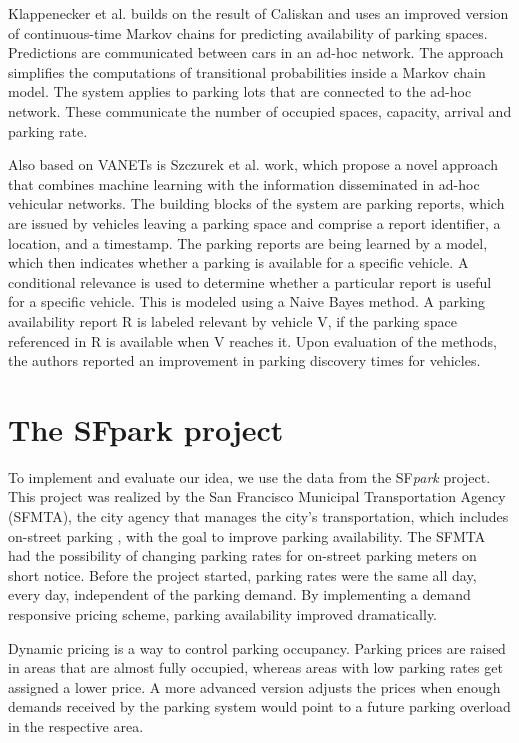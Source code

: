 	Klappenecker et al.\cite{klappenecker} builds on the result of Caliskan and uses an improved version of continuous-time Markov chains for predicting availability of parking spaces. Predictions are communicated between cars in an ad-hoc network. The approach simplifies the computations of transitional probabilities inside a Markov chain model. The system applies to parking lots that are connected to the ad-hoc network. These communicate the number of occupied spaces, capacity, arrival and parking rate. 
	
	Also based on VANETs is Szczurek et al.\cite{szczurek} work, which propose a novel approach that combines machine learning with the information disseminated in ad-hoc vehicular networks. The building blocks of the system are parking reports, which are issued by vehicles leaving a parking space and comprise a report identifier, a location, and a timestamp. The parking reports are being learned by a model, which then indicates whether a parking is available for a specific vehicle. A conditional relevance is used to determine whether a particular report is useful for a specific vehicle. This is modeled using a Naive Bayes method. A parking availability report R is labeled relevant by vehicle V, if the parking space referenced in R is available when V reaches it. Upon evaluation of the methods, the authors reported an improvement in parking discovery times for vehicles.
	
	\section{The SFpark project}
	To implement and evaluate our idea, we use the data from the SF\textit{park} project. This project was realized by the San Francisco Municipal Transportation Agency (SFMTA), the city agency that manages the city's transportation, which includes on-street parking\cite{sfpark} \cite{sfpark_evaluation}, with the goal to improve parking availability. The SFMTA had the possibility of changing parking rates for on-street parking meters on short notice. Before the project started, parking rates were the same all day, every day, independent of the parking demand. By implementing a demand responsive pricing scheme, parking availability improved dramatically.
	
	Dynamic pricing is a way to control parking occupancy. Parking prices are raised in areas that are almost fully occupied, whereas areas with low parking rates get assigned a lower price. A more advanced version adjusts the prices when enough demands received by the parking system would point to a future parking overload in the respective area.
	
